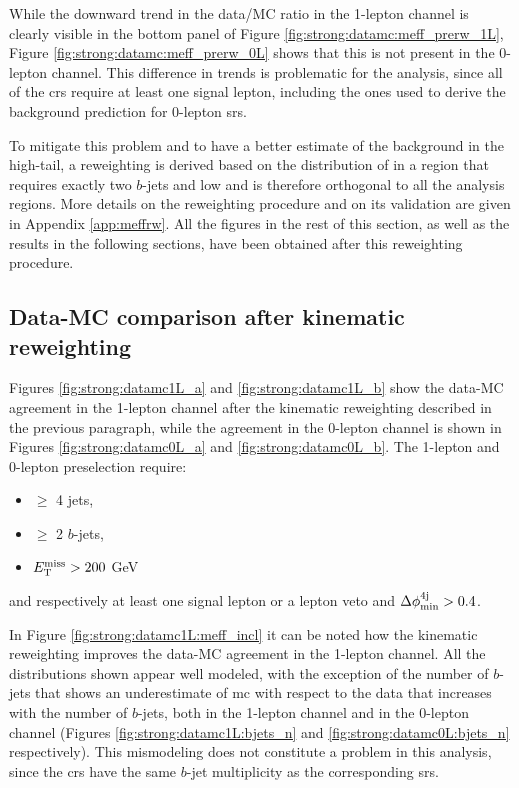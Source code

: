 While the downward trend in the data/MC ratio in the 1-lepton channel is clearly visible in the bottom panel of Figure \ref{fig:strong:datamc:meff_prerw_1L},
Figure \ref{fig:strong:datamc:meff_prerw_0L} shows that this is not present in the 0-lepton channel.
This difference in trends is problematic for the analysis, since all of the \glspl{cr} require at least one signal lepton, 
including the ones used to derive the background prediction for 0-lepton \glspl{sr}. 

To mitigate this problem and to have a better estimate of the background in the high-\meff tail, a reweighting is derived 
based on the distribution of \meff in a region that requires exactly two $b$-jets and low \mtb and is therefore
 orthogonal to all the analysis regions. More details on the reweighting procedure and on its validation are given in Appendix \ref{app:meffrw}.
All the figures in the rest of this section, as well as the results in the following sections, 
have been obtained after this reweighting procedure.


\subsection{Data-MC comparison after kinematic reweighting}

Figures \ref{fig:strong:datamc1L_a} and \ref{fig:strong:datamc1L_b} show the data-MC agreement in the 1-lepton channel after the 
kinematic reweighting described in the previous paragraph, while 
the agreement in the 0-lepton channel is shown in Figures \ref{fig:strong:datamc0L_a} and \ref{fig:strong:datamc0L_b}.
The 1-lepton and 0-lepton preselection require:
\begin{itemize}
\item $\geq$ 4 jets,
\item $\geq$ 2 $b$-jets,
\item $E_{\rm T}^{\mathrm{miss}} > 200$ GeV
\end{itemize}
and respectively at least one signal lepton or a lepton veto and $\Delta\phi_{\rm{min}}^{4{\rm{j}}} > 0.4$.

In Figure \ref{fig:strong:datamc1L:meff_incl} it can be noted how the kinematic reweighting improves the data-MC agreement in
the 1-lepton channel. 
All the distributions shown appear well modeled, with the exception of the number of $b$-jets 
that shows an underestimate of \gls{mc} with respect to the data that increases with the number of $b$-jets, both in 
the 1-lepton channel and in the 0-lepton channel 
(Figures \ref{fig:strong:datamc1L:bjets_n} and \ref{fig:strong:datamc0L:bjets_n} respectively).
This mismodeling does not constitute a problem in this analysis, 
since the \glspl{cr} have the same $b$-jet multiplicity as the corresponding \glspl{sr}.



